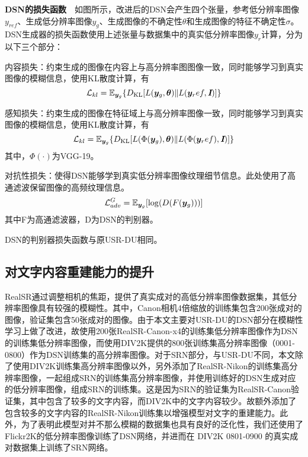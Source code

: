 \noindent\textbf{DSN的损失函数}\ \ 如图所示，改进后的DSN会产生四个张量，参考低分辨率图像$y_{ref}$、生成低分辨率图像$y_g$、生成图像的不确定性$\theta$和生成图像的特征不确定性$\sigma$。DSN生成器的损失函数使用上述张量与数据集中的真实低分辨率图像$y_r$计算，分为以下三个部分：

内容损失：约束生成的图像在内容上与高分辨率图图像一致，同时能够学习到真实图像的模糊信息，使用KL散度计算，有
\begin{equation}
    \mathcal{L}_{kl}=\mathbb{E}_{\vb*{y}_g}\{D_{\text{KL}}[L(\vb*{y}_g,\bm{\theta})\|L(\vb*{y}_ref,\textbf{\em I})]\}
\end{equation}

感知损失：约束生成的图像在特征域上与高分辨率图像一致，同时能够学习到真实图像的模糊信息，使用KL散度计算，有
\begin{equation}
    \mathcal{L}_{kl}=\mathbb{E}_{\vb*{y}_g}\{D_{\text{KL}}[L(\Phi(\vb*{y}_g),\bm{\theta})\|L(\Phi(\vb*{y}_ref),\textbf{\em I})]\}
\end{equation}
其中，$\Phi(\cdot)$为VGG-19\parencite{simonyan2014very}。

对抗性损失：使得DSN能够学到真实低分辨率图像纹理细节信息。此处使用了高通滤波保留图像的高频纹理信息。
\begin{equation}
    \mathcal{L}_{adv}^G=\mathbb{E}_{\vb*{y}_g}[\log(D(F(\vb*{y}_g)))]
\end{equation}
其中F为高通滤波器，D为DSN的判别器。

DSN的判别器损失函数与原USR-DU相同。

\subsection{对文字内容重建能力的提升}
RealSR通过调整相机的焦距，提供了真实成对的高低分辨率图像数据集，其低分辨率图像具有较强的模糊性。其中，Canon相机4倍缩放的训练集包含200张成对的图像，验证集包含50张成对的图像。由于本文主要对USR-DU的DSN部分在模糊性学习上做了改进，故使用200张RealSR-Canon-x4的训练集低分辨率图像作为DSN的训练集低分辨率图像，而使用DIV2K提供的800张训练集高分辨率图像（0001-0800）作为DSN训练集的高分辨率图像。对于SRN部分，与USR-DU不同，本文除了使用DIV2K训练集高分辨率图像以外，另外添加了RealSR-Nikon的训练集高分辨率图像，一起组成SRN的训练集高分辨率图像，并使用训练好的DSN生成对应的低分辨率图像，组成SRN的训练集。这是因为SRN的验证集为RealSR-Canon验证集，其中包含了较多的文字内容，而DIV2K中的文字内容较少。故额外添加了包含较多的文字内容的RealSR-Nikon训练集以增强模型对文字的重建能力。此外，为了表明此模型对并不那么模糊的数据集也具有良好的泛化性，我们还使用了Flickr2K的低分辨率图像训练了DSN网络，并进而在 DIV2K 0801-0900 的真实成对数据集上训练了SRN网络。
